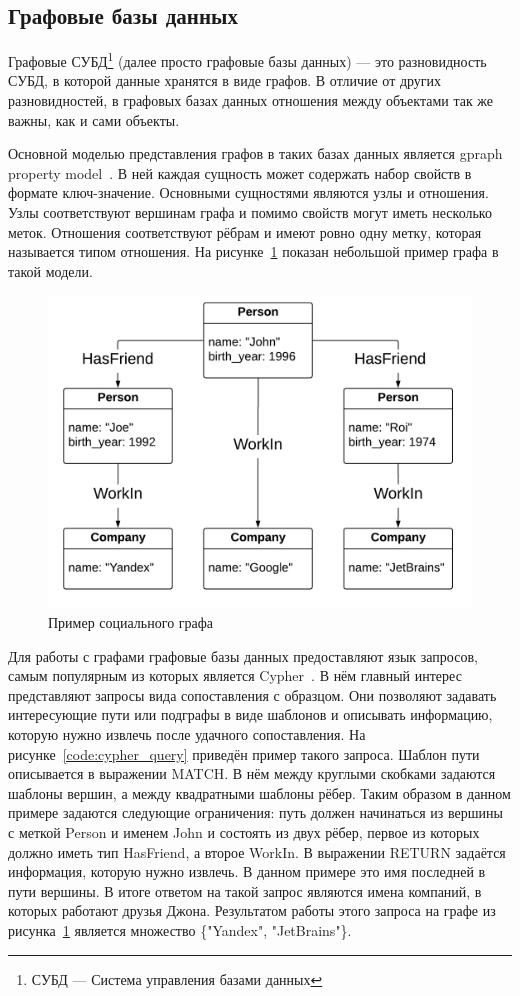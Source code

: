 \subsection{Графовые базы данных}
Графовые СУБД\footnote{СУБД --- Система управления базами данных} (далее просто графовые базы данных) --- это разновидность СУБД, в которой данные хранятся в виде графов. В отличие от других разновидностей, в графовых базах данных отношения между объектами так же важны, как и сами объекты.

Основной моделью представления графов в таких базах данных является gpraph property model~\cite{graph-propery-model}. В ней каждая сущность может содержать набор свойств в формате ключ-значение. Основными сущностями являются узлы и отношения. Узлы соответствуют вершинам графа и помимо свойств могут иметь несколько меток. Отношения соответствуют рёбрам и имеют ровно одну метку, которая называется типом отношения. На рисунке~\ref{fig:graph_bd_1} показан небольшой пример графа в такой модели. 

\begin{figure}[h]
\centering
    \includegraphics[width=0.7\linewidth]{Terekhov/pictures/graph_bd_1.png}
    \caption{Пример социального графа}
    \label{fig:graph_bd_1}
\end{figure}

Для работы с графами графовые базы данных предоставляют язык запросов, самым популярным из которых является Cypher~\cite{cypher-language}. В нём главный интерес представляют запросы вида сопоставления с образцом. Они позволяют задавать интересующие пути или подграфы в виде шаблонов и описывать информацию, которую нужно извлечь после удачного сопоставления. На рисунке~\ref{code:cypher_query} приведён пример такого запроса. Шаблон пути описывается в выражении MATCH. В нём между круглыми скобками задаются шаблоны вершин, а между квадратными шаблоны рёбер. Таким образом в данном примере задаются следующие ограничения: путь должен начинаться из вершины с меткой Person и именем John и состоять из двух рёбер, первое из которых должно иметь тип HasFriend, а второе WorkIn. В выражении RETURN задаётся информация, которую нужно извлечь. В данном примере это имя последней в пути вершины. В итоге ответом на такой запрос являются имена компаний, в которых работают друзья Джона. Результатом работы этого запроса на графе из рисунка~\ref{fig:graph_bd_1} является множество \{"Yandex", "JetBrains"\}.

